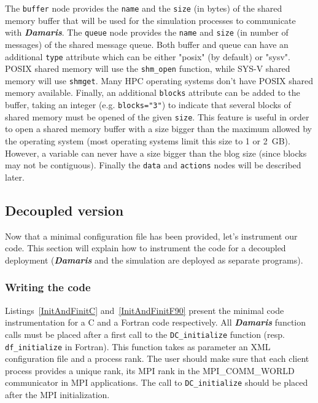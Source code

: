 \documentclass[11pt]{report}
\newcommand{\Damaris}{\emph{\textbf{Damaris}}}
\newcommand{\function}[1]{\texttt{#1}}
\begin{document}
The \texttt{buffer} node provides the \texttt{name} and the \texttt{size} (in bytes) of the shared memory buffer that
will be used for the simulation processes to communicate with \Damaris{}.
The \texttt{queue} node provides the \texttt{name} and \texttt{size} 
(in number of messages) of the shared message queue.
Both buffer and queue can have an additional \texttt{type} attribute which can be either "posix" 
(by default) or "sysv".
POSIX shared memory will use the \function{shm\_open} function, while SYS-V shared memory will
use \function{shmget}. Many HPC operating systems don't have POSIX shared memory available.
Finally, an additional \texttt{blocks} attribute can be added to the buffer, taking an integer (e.g. \texttt{blocks="3"})
to indicate that several blocks of shared memory must be opened of the given \texttt{size}. This feature is
useful in order to open a shared memory buffer 
with a size bigger than the maximum allowed by the operating system (most operating systems limit this size
to 1 or 2~GB).
However, a variable can never have a size bigger than the blog size (since blocks may not be contiguous).
Finally the \texttt{data} and \texttt{actions} nodes will be described later.

\subsection{Decoupled version}

Now that a minimal configuration file has been provided, let's instrument our code.
This section will explain how to instrument the code for a decoupled deployment 
(\Damaris{} and the simulation are deployed as separate programs).

\subsubsection{Writing the code}

Listings~\ref{InitAndFinitC} and~\ref{InitAndFinitF90} present the minimal code instrumentation
for a C and a Fortran code respectively. All \Damaris{} function calls must be placed after a first call to the
\function{DC\_initialize} function (resp. \function{df\_initialize} in Fortran). This function
takes as parameter an XML configuration file 
and a process rank. The user should make sure that each client process provides a unique rank, 
its MPI rank in the MPI\_COMM\_WORLD communicator in MPI applications.
The call to \function{DC\_initialize} should be placed after the MPI initialization.
\end{document}

